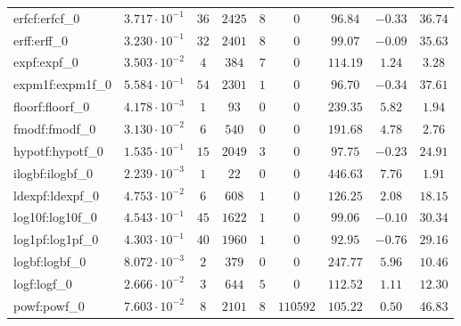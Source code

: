 \begin{tabular}{|l|c|c|c|c|c|c|c|c|}
erfcf:erfcf\_0               & $ 3.717 \cdot 10^{-1} $ & $ 36     $ & $ 2425  $ & $ 8   $ & $ 0      $ & $ 96.84       $ & $ -0.33   $ & $ 36.74   $ \\
erff:erff\_0                 & $ 3.230 \cdot 10^{-1} $ & $ 32     $ & $ 2401  $ & $ 8   $ & $ 0      $ & $ 99.07       $ & $ -0.09   $ & $ 35.63   $ \\
expf:expf\_0                 & $ 3.503 \cdot 10^{-2} $ & $ 4      $ & $ 384   $ & $ 7   $ & $ 0      $ & $ 114.19      $ & $ 1.24    $ & $ 3.28    $ \\
expm1f:expm1f\_0             & $ 5.584 \cdot 10^{-1} $ & $ 54     $ & $ 2301  $ & $ 1   $ & $ 0      $ & $ 96.70       $ & $ -0.34   $ & $ 37.61   $ \\
floorf:floorf\_0             & $ 4.178 \cdot 10^{-3} $ & $ 1      $ & $ 93    $ & $ 0   $ & $ 0      $ & $ 239.35      $ & $ 5.82    $ & $ 1.94    $ \\
fmodf:fmodf\_0               & $ 3.130 \cdot 10^{-2} $ & $ 6      $ & $ 540   $ & $ 0   $ & $ 0      $ & $ 191.68      $ & $ 4.78    $ & $ 2.76    $ \\
hypotf:hypotf\_0             & $ 1.535 \cdot 10^{-1} $ & $ 15     $ & $ 2049  $ & $ 3   $ & $ 0      $ & $ 97.75       $ & $ -0.23   $ & $ 24.91   $ \\
ilogbf:ilogbf\_0             & $ 2.239 \cdot 10^{-3} $ & $ 1      $ & $ 22    $ & $ 0   $ & $ 0      $ & $ 446.63      $ & $ 7.76    $ & $ 1.91    $ \\
ldexpf:ldexpf\_0             & $ 4.753 \cdot 10^{-2} $ & $ 6      $ & $ 608   $ & $ 1   $ & $ 0      $ & $ 126.25      $ & $ 2.08    $ & $ 18.15   $ \\
log10f:log10f\_0             & $ 4.543 \cdot 10^{-1} $ & $ 45     $ & $ 1622  $ & $ 1   $ & $ 0      $ & $ 99.06       $ & $ -0.10   $ & $ 30.34   $ \\
log1pf:log1pf\_0             & $ 4.303 \cdot 10^{-1} $ & $ 40     $ & $ 1960  $ & $ 1   $ & $ 0      $ & $ 92.95       $ & $ -0.76   $ & $ 29.16   $ \\
logbf:logbf\_0               & $ 8.072 \cdot 10^{-3} $ & $ 2      $ & $ 379   $ & $ 0   $ & $ 0      $ & $ 247.77      $ & $ 5.96    $ & $ 10.46   $ \\
logf:logf\_0                 & $ 2.666 \cdot 10^{-2} $ & $ 3      $ & $ 644   $ & $ 5   $ & $ 0      $ & $ 112.52      $ & $ 1.11    $ & $ 12.30   $ \\
powf:powf\_0                 & $ 7.603 \cdot 10^{-2} $ & $ 8      $ & $ 2101  $ & $ 8   $ & $ 110592 $ & $ 105.22      $ & $ 0.50    $ & $ 46.83   $ \\

\end{tabular}

